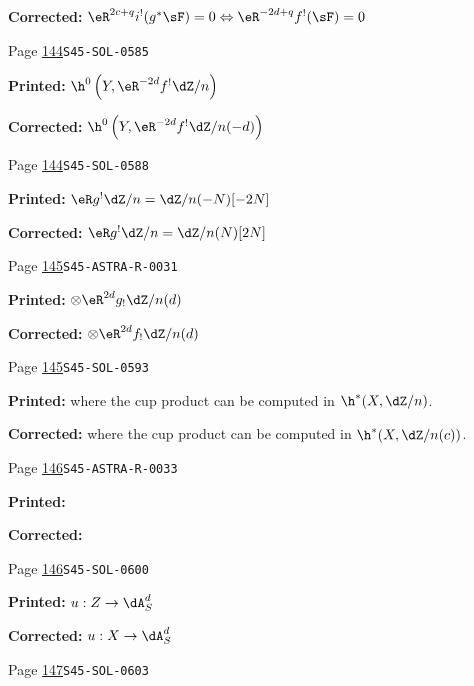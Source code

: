 \begin{description}
\par\noindent\textbf{Corrected:} \(\eR^{2 c+q} i^!(g^*\sF)=0\Leftrightarrow \eR^{-2 d+q}f^!(\sF)=0\)
\smallskip
\item[\hypertarget{apparatus:EN-0070}{70}] Page \hyperlink{printpage:en:144}{144}\quad\texttt{S45-SOL-0585}
\par\noindent\textbf{Printed:} \(\h^0\left(Y,\eR^{-2 d}f^!\dZ/n\right)\)
\par\noindent\textbf{Corrected:} \(\h^0\left(Y,\eR^{-2 d}f^!\dZ/n(-d)\right)\)
\smallskip
\item[\hypertarget{apparatus:EN-0071}{71}] Page \hyperlink{printpage:en:144}{144}\quad\texttt{S45-SOL-0588}
\par\noindent\textbf{Printed:} \(\eR g^! \dZ/n=\dZ/n(-N)[-2 N]\)
\par\noindent\textbf{Corrected:} \(\eR g^! \dZ/n=\dZ/n(N)[2 N]\)
\smallskip
\item[\hypertarget{apparatus:EN-0072}{72}] Page \hyperlink{printpage:en:145}{145}\quad\texttt{S45-ASTRA-R-0031}
\par\noindent\textbf{Printed:} \(\otimes \eR^{2 d} g_!\dZ/n(d)\)
\par\noindent\textbf{Corrected:} \(\otimes \eR^{2 d} f_!\dZ/n(d)\)
\smallskip
\item[\hypertarget{apparatus:EN-0073}{73}] Page \hyperlink{printpage:en:145}{145}\quad\texttt{S45-SOL-0593}
\par\noindent\textbf{Printed:} where the cup product can be computed in $\h^*(X,\dZ/n)$.
\par\noindent\textbf{Corrected:} where the cup product can be computed in $\h^*(X,\dZ/n(c))$.
\smallskip
\item[\hypertarget{apparatus:EN-0074}{74}] Page \hyperlink{printpage:en:146}{146}\quad\texttt{S45-ASTRA-R-0033}
\par\noindent\textbf{Printed:} 
\par\noindent\textbf{Corrected:} 
\smallskip
\item[\hypertarget{apparatus:EN-0075}{75}] Page \hyperlink{printpage:en:146}{146}\quad\texttt{S45-SOL-0600}
\par\noindent\textbf{Printed:} \(u:Z\to \dA_S^d\)
\par\noindent\textbf{Corrected:} \(u:X\to \dA_S^d\)
\smallskip
\item[\hypertarget{apparatus:EN-0076}{76}] Page \hyperlink{printpage:en:147}{147}\quad\texttt{S45-SOL-0603}

\end{description}
